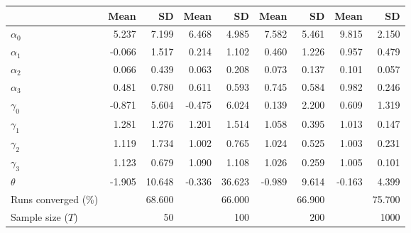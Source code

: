 
\begin{tabular}[t]{lrrrrrrrr}
\toprule
  & Mean & SD & Mean  & SD  & Mean   & SD   & Mean    & SD   \\
\midrule
$\alpha_{0}$ & 5.237 & 7.199 & 6.468 & 4.985 & 7.582 & 5.461 & 9.815 & 2.150\\
$\alpha_{1}$ & -0.066 & 1.517 & 0.214 & 1.102 & 0.460 & 1.226 & 0.957 & 0.479\\
$\alpha_{2}$ & 0.066 & 0.439 & 0.063 & 0.208 & 0.073 & 0.137 & 0.101 & 0.057\\
$\alpha_{3}$ & 0.481 & 0.780 & 0.611 & 0.593 & 0.745 & 0.584 & 0.982 & 0.246\\
$\gamma_{0}$ & -0.871 & 5.604 & -0.475 & 6.024 & 0.139 & 2.200 & 0.609 & 1.319\\
$\gamma_{1}$ & 1.281 & 1.276 & 1.201 & 1.514 & 1.058 & 0.395 & 1.013 & 0.147\\
$\gamma_{2}$ & 1.119 & 1.734 & 1.002 & 0.765 & 1.024 & 0.525 & 1.003 & 0.231\\
$\gamma_{3}$ & 1.123 & 0.679 & 1.090 & 1.108 & 1.026 & 0.259 & 1.005 & 0.101\\
$\theta$ & -1.905 & 10.648 & -0.336 & 36.623 & -0.989 & 9.614 & -0.163 & 4.399\\
Runs converged (\%) &  & 68.600 &  & 66.000 &  & 66.900 &  & 75.700\\
Sample size ($T$) &  & 50 &  & 100 &  & 200 &  & 1000\\
\bottomrule
\end{tabular}
